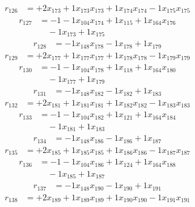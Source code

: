 \[\begin{aligned}
r_{126} &= + 2 x_{173} + 1 x_{173} x_{173} + 1 x_{174} x_{174} - 1 x_{175} x_{175}
\end{aligned}\]
\[\begin{aligned}
r_{127} &= - 1 - 1 x_{104} x_{174} + 1 x_{115} + 1 x_{164} x_{176} \\
 &\quad - 1 x_{173} + 1 x_{175}
\end{aligned}\]
\[\begin{aligned}
r_{128} &= - 1 x_{148} x_{178} - 1 x_{178} + 1 x_{179}
\end{aligned}\]
\[\begin{aligned}
r_{129} &= + 2 x_{177} + 1 x_{177} x_{177} + 1 x_{178} x_{178} - 1 x_{179} x_{179}
\end{aligned}\]
\[\begin{aligned}
r_{130} &= - 1 - 1 x_{104} x_{178} + 1 x_{118} + 1 x_{164} x_{180} \\
 &\quad - 1 x_{177} + 1 x_{179}
\end{aligned}\]
\[\begin{aligned}
r_{131} &= - 1 x_{148} x_{182} - 1 x_{182} + 1 x_{183}
\end{aligned}\]
\[\begin{aligned}
r_{132} &= + 2 x_{181} + 1 x_{181} x_{181} + 1 x_{182} x_{182} - 1 x_{183} x_{183}
\end{aligned}\]
\[\begin{aligned}
r_{133} &= - 1 - 1 x_{104} x_{182} + 1 x_{121} + 1 x_{164} x_{184} \\
 &\quad - 1 x_{181} + 1 x_{183}
\end{aligned}\]
\[\begin{aligned}
r_{134} &= - 1 x_{148} x_{186} - 1 x_{186} + 1 x_{187}
\end{aligned}\]
\[\begin{aligned}
r_{135} &= + 2 x_{185} + 1 x_{185} x_{185} + 1 x_{186} x_{186} - 1 x_{187} x_{187}
\end{aligned}\]
\[\begin{aligned}
r_{136} &= - 1 - 1 x_{104} x_{186} + 1 x_{124} + 1 x_{164} x_{188} \\
 &\quad - 1 x_{185} + 1 x_{187}
\end{aligned}\]
\[\begin{aligned}
r_{137} &= - 1 x_{148} x_{190} - 1 x_{190} + 1 x_{191}
\end{aligned}\]
\[\begin{aligned}
r_{138} &= + 2 x_{189} + 1 x_{189} x_{189} + 1 x_{190} x_{190} - 1 x_{191} x_{191}
\end{aligned}\]
